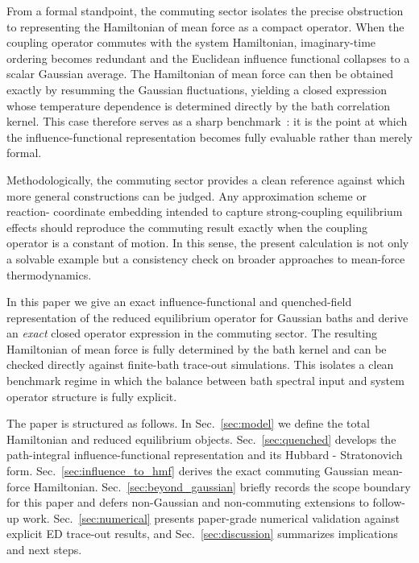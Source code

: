 From a formal standpoint, the commuting sector isolates the precise obstruction
to representing the Hamiltonian of mean force as a compact operator. When the
coupling operator commutes with the system Hamiltonian, imaginary-time ordering
becomes redundant and the Euclidean influence functional collapses to a scalar
Gaussian average. The Hamiltonian of mean force can then be obtained exactly by
resumming the Gaussian fluctuations, yielding a closed expression whose
temperature dependence is determined directly by the bath correlation kernel.
This case therefore serves as a sharp benchmark~\cite{campisiTalknerHanggi2009Solvable}: it is the point at which the
influence-functional representation becomes fully evaluable rather than merely
formal.

Methodologically, the commuting sector provides a clean reference against which
more general constructions can be judged. Any approximation scheme or reaction-
coordinate embedding intended to capture strong-coupling equilibrium effects
should reproduce the commuting result exactly when the coupling operator is a
constant of motion. In this sense, the present calculation is not only a solvable
example but a consistency check on broader approaches to mean-force
thermodynamics.


In this paper we give an exact influence-functional and quenched-field
representation of the reduced equilibrium operator for Gaussian baths and derive
an \emph{exact} closed operator expression in the commuting sector. The resulting
Hamiltonian of mean force is fully determined by the bath kernel and can be
checked directly against finite-bath trace-out simulations. This isolates a
clean benchmark regime in which the balance between bath spectral input and
system operator structure is fully explicit.

The paper is structured as follows. In Sec.~\ref{sec:model} we define the total
Hamiltonian and reduced equilibrium objects. Sec.~\ref{sec:quenched} develops
the path-integral influence-functional representation and its
Hubbard - Stratonovich form. Sec.~\ref{sec:influence_to_hmf} derives the exact
commuting Gaussian mean-force Hamiltonian. Sec.~\ref{sec:beyond_gaussian}
briefly records the scope boundary for this paper and defers non-Gaussian and
non-commuting extensions to follow-up work. Sec.~\ref{sec:numerical} presents
paper-grade numerical validation against explicit ED trace-out results, and
Sec.~\ref{sec:discussion} summarizes implications and next steps.

